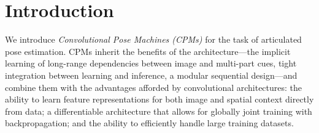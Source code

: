\documentclass[10pt,twocolumn,letterpaper]{article}
\begin{document}
\section{Introduction}%

We introduce \emph{Convolutional Pose Machines (CPMs)} for the task of articulated pose estimation. CPMs inherit the benefits of the \emph{\posemachine}\cite{Ramakrishna2014posemachines} architecture---the implicit learning of long-range dependencies between image and multi-part cues, tight integration between learning and inference, a modular sequential design---and combine them with the advantages afforded by convolutional architectures: the ability to learn feature representations for both image and spatial context directly from data; a differentiable architecture that allows for globally joint training with backpropagation; and the ability to efficiently handle large training datasets. 
\end{document}
